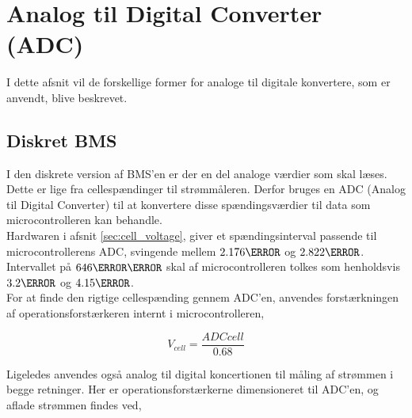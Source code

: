 \section{Analog til Digital Converter (ADC)}
I dette afsnit vil de forskellige former for analoge til digitale konvertere, som er anvendt, blive beskrevet. 

\subsection{Diskret BMS}
I den diskrete version af BMS'en er der en del analoge værdier som skal læses. Dette er lige fra cellespændinger til strømmåleren. Derfor bruges en ADC (Analog til Digital Converter) til at konvertere disse spændingsværdier til data som microcontrolleren kan behandle.
\\

Hardwaren i afsnit \ref{sec:cell_voltage}, giver et spændingsinterval passende til microcontrollerens ADC, svingende mellem $2.176\volt$ og $2.822\volt$. Intervallet på $646\milli\volt$ skal af microcontrolleren tolkes som henholdsvis $3.2\volt$ og $4.15\volt$.
\\

For at finde den rigtige cellespænding gennem ADC'en, anvendes  forstærkningen af operationsforstærkeren internt i microcontrolleren,

\begin {equation}
V_{cell} =  \frac{ADCcell}{0.68} \label{eq:ADC}
\end {equation}


Ligeledes anvendes også analog til digital koncertionen til måling af strømmen i begge retninger. Her er operationsforstærkerne dimensioneret til ADC'en, og aflade strømmen findes ved,

